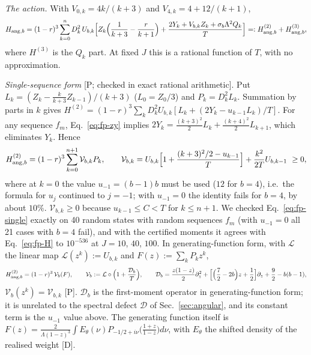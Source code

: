 \emph{The action.} With $V_{0,k}=4k/(k+3)$ and $V_{4,k}=4+12/(k+1)$,
\begin{equation}
H_{{\rm ang},b}=(1-r)^3\sum_{k=0}^{n}D_k^2\,U_{b,k}\Big[Z_k\Big(\frac1{k+3}-\frac r{k+1}\Big)+\frac{2Y_k+V_{b,k}Z_k+\sigma_b\Lambda^2Q_k}{T}\Big]
=:H^{(2)}_{{\rm ang},b}+H^{(3)}_{{\rm ang},b},
\label{eq:fp-H}
\end{equation}
where $H^{(3)}$ is the $Q_k$ part. At fixed $J$ this is a rational function of $T$, with no approximation.

\emph{Single-sequence form} [P; checked in exact rational arithmetic]. Put $L_k=(Z_k-\frac k{k+3}Z_{k-1})/(k+3)$ ($L_0=Z_0/3$) and
$P_k=D_k^2L_k$. Summation by parts in $k$ gives $H^{(2)}=(1-r)^3\sum_kD_k^2U_{b,k}[L_k+(2Y_k-u_{k-1}L_k)/T]$. For any sequence $f_m$,
Eq.~\eqref{eq:fp-zy} implies $2Y_k=\frac{(k+3)^2}2L_k+\frac{(k+4)^2}2L_{k+1}$, which eliminates $Y_k$. Hence
\begin{equation}
H^{(2)}_{{\rm ang},b}=(1-r)^3\sum_{k=0}^{n+1}\mathcal V_{b,k}P_k,\qquad
\mathcal V_{b,k}=U_{b,k}\Big[1+\frac{(k+3)^2/2-u_{k-1}}{T}\Big]+\frac{k^2}{2T}U_{b,k-1}\ \ge0,
\label{eq:fp-single}
\end{equation}
where at $k=0$ the value $u_{-1}=(b-1)b$ must be used ($12$ for $b=4$), i.e.\ the formula for $u_j$ continued to $j=-1$; with
$u_{-1}=0$ the identity fails for $b=4$, by about $10\%$. $\mathcal V_{b,k}\ge0$ because $u_{k-1}\le C<T$ for $k\le n+1$. We checked
Eq.~\eqref{eq:fp-single} exactly on 40 random states with random sequences $f_m$ (with $u_{-1}=0$ all 21 cases with $b=4$ fail), and
with the certified moments it agrees with Eq.~\eqref{eq:fp-H} to $10^{-536}$ at $J=10$, $40$, $100$. In generating-function form,
with $\mathcal L$ the linear map $\mathcal L(z^k):=U_{b,k}$ and $F(z):=\sum_kP_kz^k$,
\begin{equation}
H^{(2)}_{{\rm ang},b}=(1-r)^3\,\mathcal V_b(F),\qquad \mathcal V_b:=\mathcal L\circ\Big(1+\frac{\mathcal D_b}T\Big),\qquad
\mathcal D_b=\frac{z(1-z)}2\partial_z^2+\Big[\Big(\frac72-2b\Big)z+\frac12\Big]\partial_z+\frac92-b(b-1),
\label{eq:fp-V}
\end{equation}
$\mathcal V_b(z^k)=\mathcal V_{b,k}$ [P]. $\mathcal D_b$ is the first-moment operator in generating-function form; it is unrelated to
the spectral defect $\mathcal D$ of Sec.~\ref{sec:angular}, and its constant term is the $u_{-1}$ value above. The generating function
itself is $F(z)=\frac2{\Lambda(1-z)^3}\int E_\theta(\nu)P_{-1/2+i\nu}\big(\frac{1+z}{1-z}\big)d\nu$, with $E_\theta$ the shifted
density of the realised weight [D].

